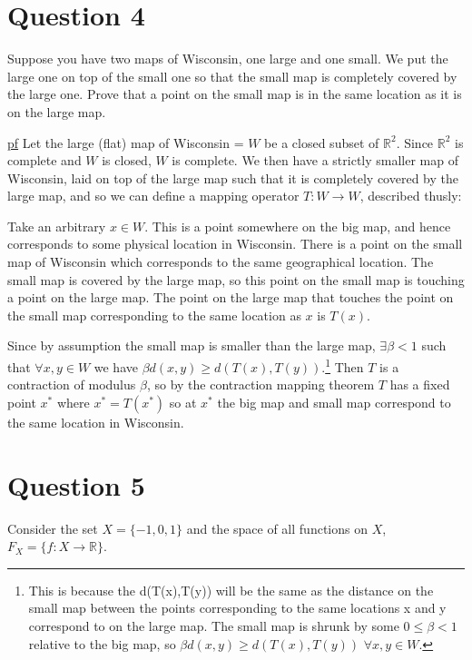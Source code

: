 \documentclass[11pt]{article} %
\begin{document}
\section{Question 4}
Suppose you have two maps of Wisconsin, one large and one small. We put the large one on top of the small one so that the small map is completely covered by the large one. Prove that a point on the small map is in the same location as it is on the large map.

\underline{pf} Let the large (flat) map of Wisconsin = $W$ be a closed subset of $\mathbb{R}^2$. Since $\mathbb{R}^2$ is complete and $W$ is closed, $W$ is complete. We then have a strictly smaller map of Wisconsin, laid on top of the large map such that it is completely covered by the large map, and so we can define a mapping operator $T: W \rightarrow W$, described thusly: 

Take an arbitrary $x \in W$. This is a point somewhere on the big map, and hence corresponds to some physical location in Wisconsin. There is a point on the small map of Wisconsin which corresponds to the same geographical location. The small map is covered by the large map, so this point on the small map is touching a point on the large map. The point on the large map that touches the point on the small map corresponding to the same location as $x$ is $T(x)$.

Since by assumption the small map is smaller than the large map, $\exists \beta <1$ such that $\forall x,y \in W$ we have $\beta d(x,y)\geq d(T(x),T(y)).$\footnote{This is because the d(T(x),T(y)) will be the same as the distance on the small map between the points corresponding to the same locations  x and y correspond to on the large map. The small map is shrunk by some $0\leq \beta <1$ relative to the big map, so $\beta d(x,y) \geq d(T(x),T(y))$ $\forall x,y \in W.$ } Then $T$ is a contraction of modulus $\beta$, so by the contraction mapping theorem $T$ has a fixed point $x^*$ where $x^* = T(x^*)$ so at $x^*$ the big map and small map correspond to the same location in Wisconsin.

\section{Question 5}
Consider the set $X = \{ -1, 0, 1 \}$ and the space of all functions on $X$, $F_X = \{ f: X \rightarrow \mathbb{R} \}$.
\end{document}
